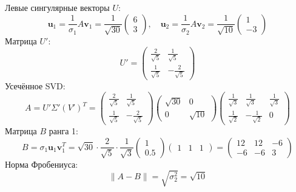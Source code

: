\documentclass[a4paper]{article}
\begin{document}
\begin{enumerate}
\begin{enumerate}
\begin{itemize}
\[    \]
  \end{itemize}
  Левые сингулярные векторы \( U \):  
  \[
  \mathbf{u}_1 = \frac{1}{\sigma_1} A \mathbf{v}_1 = 
  \frac{1}{\sqrt{30}} \begin{pmatrix} 6 \\ 3 \end{pmatrix}, 
  \quad \mathbf{u}_2 = \frac{1}{\sigma_2} A \mathbf{v}_2 =
   \frac{1}{\sqrt{10}} \begin{pmatrix} 1 \\ -3 \end{pmatrix}
  \]  
  Матрица \( U' \):  
  \[
  U' = \begin{pmatrix}
  \frac{2}{\sqrt{5}} & \frac{1}{\sqrt{5}} \\
  \frac{1}{\sqrt{5}} & -\frac{2}{\sqrt{5}}
  \end{pmatrix}
  \]
  Усечённое SVD:
  \[
  A = U' \Sigma' (V')^T = \begin{pmatrix}
  \frac{2}{\sqrt{5}} & \frac{1}{\sqrt{5}} \\
  \frac{1}{\sqrt{5}} & -\frac{2}{\sqrt{5}}
  \end{pmatrix} \begin{pmatrix}
  \sqrt{30} & 0 \\
  0 & \sqrt{10}
  \end{pmatrix} \begin{pmatrix}
  \frac{1}{\sqrt{3}} & \frac{1}{\sqrt{3}} & \frac{1}{\sqrt{3}} \\
  \frac{1}{\sqrt{2}} & -\frac{1}{\sqrt{2}} & 0
  \end{pmatrix}
  \]
  Матрица \( B \) ранга 1:
  \[
  B = \sigma_1 \mathbf{u}_1 \mathbf{v}_1^T =
  \sqrt{30} \cdot \frac{2}{\sqrt{5}} \cdot \frac{1}{\sqrt{3}}
   \begin{pmatrix} 1 \\ 0.5 \end{pmatrix} \begin{pmatrix} 1 & 1 & 1 \end{pmatrix}
   = \begin{pmatrix}
  12 & 12 & -6 \\
  -6 & -6 & 3
  \end{pmatrix}
  \]  
  Норма Фробениуса:  
  \[
  \|A - B\| = \sqrt{\sigma_2^2} = \sqrt{10}
  \]


\end{enumerate}
\end{enumerate}
\end{document}
